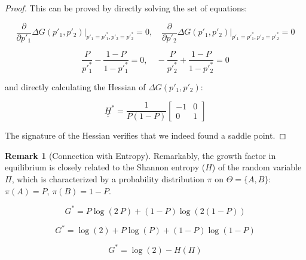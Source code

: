 \documentclass{article}
\theoremstyle{definition}
\newtheorem*{remark}{Remark}
\begin{document}
\begin{proof}
    This can be proved by directly solving the set of equations:
    
    \begin{equation}
        \frac{\partial}{\partial p'_1} \Delta G(p'_1,p'_2) \Bigr|_{p'_1=p'^*_1,p'_2=p'^*_2} = 0, \quad
        \frac{\partial}{\partial p'_2} \Delta G(p'_1,p'_2) \Bigr|_{p'_1=p'^*_1,p'_2=p'^*_2} = 0
    \end{equation}

    \begin{equation}
        \frac{P}{p'^*_1} - \frac{1-P}{1-p'^*_1} = 0,
        \quad
        -\frac{P}{p'^*_2} + \frac{1-P}{1-p'^*_2} = 0
    \end{equation}

    and directly calculating the Hessian of $\Delta G(p'_1,p'_2)$:

    \begin{equation}
        \underline{\underline{H}}^* = 
        \frac{1}{P(1-P)}
        \begin{bmatrix}
        -1 & 0 \\
        0 & 1
        \end{bmatrix}
    \end{equation}

    The signature of the Hessian verifies that we indeed found a saddle point.
    
\end{proof}

\begin{remark}[Connection with Entropy]
Remarkably, the growth factor in equilibrium is closely related to the Shannon entropy ($H$) \cite{paper:ShannonOriginal, book:InformationTheory} of the random variable $\Pi$, which is characterized by a probability distribution $\pi$ on $\Theta = \{A,B\}$: $\pi(A)=P$, $\pi(B)=1-P$.

\begin{equation}
    G^* = P \log(2 \ P) + (1-P) \log(2(1-P))
\end{equation}

\begin{equation}
    G^* = \log(2) + P \log(P) + (1-P) \log(1-P)
\end{equation}

\begin{equation}
    G^*= \log(2) - H(\Pi)
\end{equation}

\end{remark}
\end{document}

